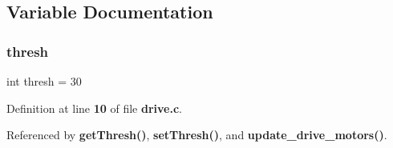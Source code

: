 \subsection{Variable Documentation}
\mbox{\label{drive_8c_a6cf8bf160a02413bc3d5d18b0294b581}} 
\subsubsection{thresh}
{\footnotesize\ttfamily int thresh = 30\hspace{0.3cm}{\ttfamily [static]}}



Definition at line \textbf{ 10} of file \textbf{ drive.\+c}.



Referenced by \textbf{ get\+Thresh()}, \textbf{ set\+Thresh()}, and \textbf{ update\+\_\+drive\+\_\+motors()}.

